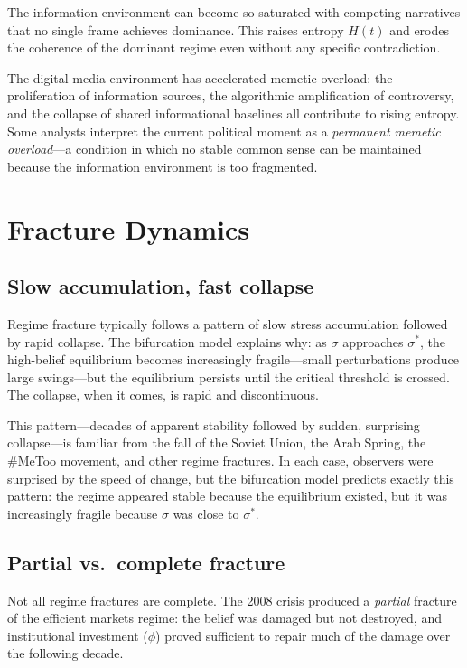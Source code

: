 The information environment can become so saturated with competing narratives that no single frame achieves dominance.
This raises entropy $H(t)$ and erodes the coherence of the dominant regime even without any specific contradiction.

The digital media environment has accelerated memetic overload: the proliferation of information sources, the algorithmic amplification of controversy, and the collapse of shared informational baselines all contribute to rising entropy.
Some analysts interpret the current political moment as a \emph{permanent memetic overload}---a condition in which no stable common sense can be maintained because the information environment is too fragmented.

\section{Fracture Dynamics}
\label{sec:ch30-dynamics}

\subsection{Slow accumulation, fast collapse}

Regime fracture typically follows a pattern of slow stress accumulation followed by rapid collapse.
The bifurcation model explains why: as $\sigma$ approaches $\sigma^*$, the high-belief equilibrium becomes increasingly fragile---small perturbations produce large swings---but the equilibrium persists until the critical threshold is crossed.
The collapse, when it comes, is rapid and discontinuous.

This pattern---decades of apparent stability followed by sudden, surprising collapse---is familiar from the fall of the Soviet Union, the Arab Spring, the \#MeToo movement, and other regime fractures.
In each case, observers were surprised by the speed of change, but the bifurcation model predicts exactly this pattern: the regime appeared stable because the equilibrium existed, but it was increasingly fragile because $\sigma$ was close to $\sigma^*$.

\subsection{Partial vs.\ complete fracture}

Not all regime fractures are complete.
The 2008 crisis produced a \emph{partial} fracture of the efficient markets regime: the belief was damaged but not destroyed, and institutional investment ($\phi$) proved sufficient to repair much of the damage over the following decade.

